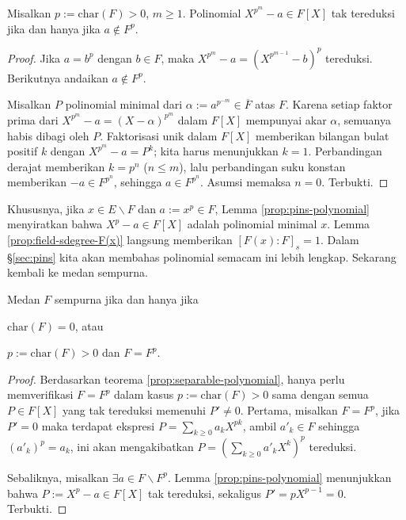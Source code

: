 \begin{lemma}\label{prop:pins-polynomial}
	Misalkan $p := \text{char}(F) > 0$, $m \geq 1$. Polinomial $X^{p^m} - a \in F[X]$ tak tereduksi jika dan hanya jika $a \notin F^p$.
\end{lemma}
\begin{proof}
	Jika $a = b^p$ dengan $b \in F$, maka $X^{p^m}-a = \left( X^{p^{m-1}}-b \right)^p$ tereduksi. Berikutnya andaikan $a \notin F^p$.

	Misalkan $P$ polinomial minimal dari $\alpha := a^{p^{-m}} \in \overline{F}$ atas $F$. Karena setiap faktor prima dari $X^{p^m}-a =(X-\alpha)^{p^m}$ dalam $F[X]$ mempunyai akar $\alpha$, semuanya habis dibagi oleh $P$. Faktorisasi unik dalam $F[X]$ memberikan bilangan bulat positif $k$ dengan $X^{p^m}-a = P^k$; kita harus menunjukkan $k=1$. Perbandingan derajat memberikan $k = p^n$ ($n \leq m$), lalu perbandingan suku konstan memberikan $-a \in F^{p^n}$, sehingga $a \in F^{p^n}$. Asumsi memaksa $n=0$. Terbukti.
\end{proof}
Khususnya, jika $x \in E \smallsetminus F$ dan $a := x^p \in F$, Lemma \ref{prop:pins-polynomial} menyiratkan bahwa $X^p - a \in F[X]$ adalah polinomial minimal $x$. Lemma \ref{prop:field-sdegree-F(x)} langsung memberikan $[F(x):F]_s = 1$. Dalam \S\ref{sec:pins} kita akan membahas polinomial semacam ini lebih lengkap. Sekarang kembali ke medan sempurna.

\begin{theorem}\label{prop:perfect-field-char}
	Medan $F$ sempurna jika dan hanya jika
	\begin{inparaenum}[(a)]
		\item $\text{char}(F)=0$, atau
		\item $p := \text{char}(F) > 0$ dan $F = F^p$.
	\end{inparaenum}
\end{theorem}
\begin{proof}
	Berdasarkan teorema \ref{prop:separable-polynomial}, hanya perlu memverifikasi $F=F^p$ dalam kasus $p := \text{char}(F) > 0$ sama dengan semua $P \in F[X]$ yang tak tereduksi memenuhi $P' \neq 0$. Pertama, misalkan $F=F^p$, jika $P' = 0$ maka terdapat ekspresi $P = \sum_{k \geq 0} a_k X^{pk}$, ambil $a'_k \in F$ sehingga $(a'_k)^p = a_k$, ini akan mengakibatkan $P = (\sum_{k \geq 0} a'_k X^k)^p$ tereduksi.
	
	Sebaliknya, misalkan $\exists a \in F \smallsetminus F^p$. Lemma \ref{prop:pins-polynomial} menunjukkan bahwa $P := X^p - a \in F[X]$ tak tereduksi, sekaligus $P' = pX^{p-1} = 0$. Terbukti.
\end{proof}

